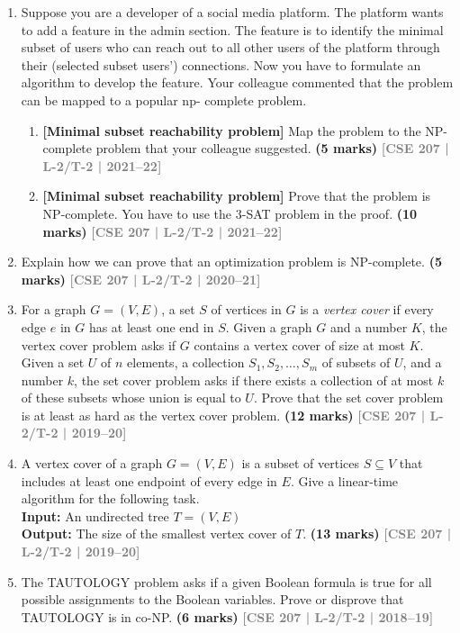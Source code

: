 \documentclass[12pt,a3paper]{article}
\newcommand{\yr}[1]{\hfill\textcolor{gray}{\small\textbf{[#1]}}}
\newcommand{\mk}[1]{\textcolor{orange!70!black}{\small\textbf{(#1 marks)}}}
\begin{document}
\begin{enumerate}
\item Suppose you are a developer of a social media platform. The platform wants to 
    add a feature in the admin section. The feature is to identify the minimal subset of 
    users who can reach out to all other users of the platform through their (selected 
    subset users') connections. Now you have to formulate an algorithm to develop the 
    feature. Your colleague commented that the problem can be mapped to a popular np-
    complete problem.
\begin{enumerate}

\item \textbf{[Minimal subset reachability problem]} Map the problem to the NP-complete problem that your colleague suggested.
\mk{5} \yr{CSE 207 | L-2/T-2 | 2021--22}

\item \textbf{[Minimal subset reachability problem]} Prove that the problem is NP-complete. You have to use the 3-SAT problem in the proof.
\mk{10} \yr{CSE 207 | L-2/T-2 | 2021--22}
\end{enumerate}
\item Explain how we can prove that an optimization problem is NP-complete.
\mk{5} \yr{CSE 207 | L-2/T-2 | 2020--21}

\item For a graph $G = (V, E)$, a set $S$ of vertices in $G$ is a \textit{vertex cover} if every edge $e$ in $G$ has at least one end in $S$. Given a graph $G$ and a number $K$, the vertex cover problem asks if $G$ contains a vertex cover of size at most $K$. Given a set $U$ of $n$ elements, a collection $S_1, S_2, \ldots, S_m$ of subsets of $U$, and a number $k$, the set cover problem asks if there exists a collection of at most $k$ of these subsets whose union is equal to $U$. Prove that the set cover problem is at least as hard as the vertex cover problem.
\mk{12} \yr{CSE 207 | L-2/T-2 | 2019--20}

\item A vertex cover of a graph $G = (V, E)$ is a subset of vertices $S \subseteq V$ that includes at least one endpoint of every edge in $E$. Give a linear-time algorithm for the following task.\\
\textbf{Input:} An undirected tree $T = (V, E)$\\
\textbf{Output:} The size of the smallest vertex cover of $T$.
\mk{13} \yr{CSE 207 | L-2/T-2 | 2019--20}

\item The TAUTOLOGY problem asks if a given Boolean formula is true for all possible assignments to the Boolean variables. Prove or disprove that TAUTOLOGY is in co-NP.
\mk{6} \yr{CSE 207 | L-2/T-2 | 2018--19}


\end{enumerate}
\end{document}
